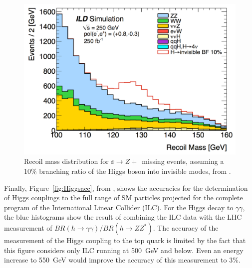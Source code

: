 \documentclass[12pt]{article}
\begin{document}
\begin{figure}
\begin{center}
\includegraphics[width=0.55\hsize]{Hinvisible.pdf}
\end{center}
\caption{Recoil mass distribution for $\ee\to Z +$~missing events,
  assuming a 10\% branching ratio of the Higgs boson into invisible
  modes, from \cite{invisible}.}
\label{fig:hinvisible}
\end{figure}

Finally,
Figure~\ref{fig:Higgsacc}, from \cite{ILCcase}, shows the 
accuracies for the determination of Higgs couplings to the full range
of SM particles projected for the complete program of the
International Linear Collider  (ILC).   For the Higgs decay to
$\gamma\gamma$, the blue histograms show the result of combining the
ILC data with the LHC measurement of $BR(h\to \gamma\gamma)/BR(h\to
ZZ^*)$.   The accuracy of the measurement of the Higgs coupling to the
top quark is limited by the fact that this figure considers only ILC
running at 500~GeV and below.   Even an energy increase to 550~GeV
would improve the accuracy of this measurement to 3\%.
\end{document}
